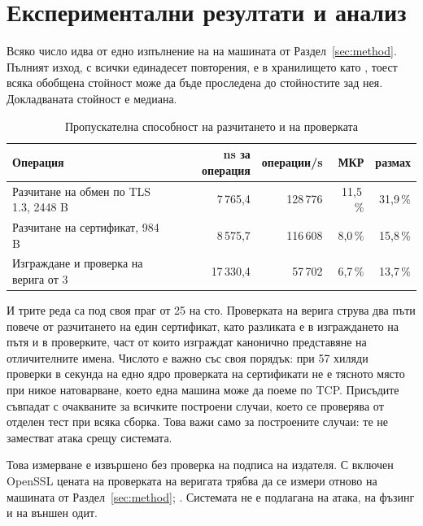 \section{Експериментални резултати и анализ}
\label{sec:results}

Всяко число идва от едно изпълнение на 
на машината от Раздел~\ref{sec:method}. Пълният изход, с всички единадесет повторения, е в
хранилището като , тоест всяка обобщена стойност може да
бъде проследена до стойностите зад нея. Докладваната стойност е медиана.

\begin{table}[htbp]
\caption{Пропускателна способност на разчитането и на проверката}
\label{tab:parser}
\centering
\fontsize{11}{13}\selectfont
\begin{tabular}{L{5.4cm} r r r r}
\toprule
Операция & ns за операция & операции/s & МКР & размах \\
\midrule
Разчитане на обмен по TLS 1.3, 2448 B & 7\,765,4 & 128\,776 & 11,5\,\% & 31,9\,\% \\
Разчитане на сертификат, 984 B & 8\,575,7 & 116\,608 & 8,0\,\% & 15,8\,\% \\
Изграждане и проверка на верига от 3 & 17\,330,4 & 57\,702 & 6,7\,\% & 13,7\,\% \\
\bottomrule
\end{tabular}
\end{table}

И трите реда са под своя праг от 25 на сто. Проверката на верига струва два пъти повече от
разчитането на един сертификат, като разликата е в изграждането на пътя и в проверките, част от
които изграждат канонично представяне на отличителните имена. Числото е важно със своя порядък:
при 57 хиляди проверки в секунда на едно ядро проверката на сертификати не е тясното място при
никое натоварване, което една машина може да поеме по TCP. Присъдите съвпадат с очакваните за
всичките построени случаи, което се проверява от отделен тест при всяка сборка. Това
важи само за построените случаи: те не заместват атака срещу системата.

Това измерване е извършено без проверка на подписа на издателя. С включен OpenSSL цената на
проверката на веригата трябва да се измери отново на машината от Раздел~\ref{sec:method};
.
Системата не е подлагана на атака, на фъзинг и на външен одит.

